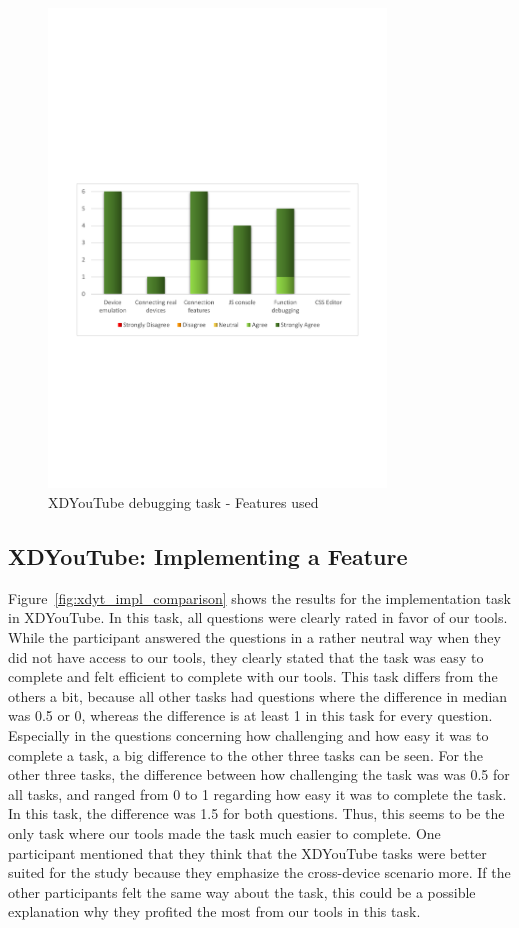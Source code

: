 \begin{figure}[H]
  \centering
    \includegraphics[width=0.8\textwidth]{images/charts/xdyt_bug_features_used.pdf}
	\caption[xdyt-bug: Features used]{XDYouTube debugging task - Features used}
	\label{fig:xdyt_bug_features_used}
\end{figure}

\subsection{XDYouTube: Implementing a Feature}

Figure~\ref{fig:xdyt_impl_comparison} shows the results for the implementation task in XDYouTube. In this task, all questions were clearly rated in favor of our tools. While the participant answered the questions in a rather neutral way when they did not have access to our tools, they clearly stated that the task was easy to complete and felt efficient to complete with our tools. This task differs from the others a bit, because all other tasks had questions where the difference in median was 0.5 or 0, whereas the difference is at least 1 in this task for every question. Especially in the questions concerning how challenging and how easy it was to complete a task, a big difference to the other three tasks can be seen. For the other three tasks, the difference between how challenging the task was was 0.5 for all tasks, and ranged from 0 to 1 regarding how easy it was to complete the task. In this task, the difference was 1.5 for both questions. Thus, this seems to be the only task where our tools made the task much easier to complete. One participant mentioned that they think that the XDYouTube tasks were better suited for the study because they emphasize the cross-device scenario more. If the other participants felt the same way about the task, this could be a possible explanation why they profited the most from our tools in this task.

